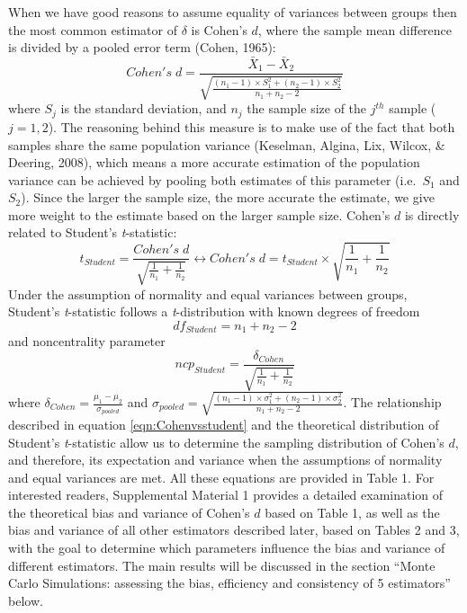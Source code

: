 \documentclass[
  12pt,
  french,
]{article}
\begin{document}
When we have good reasons to assume equality of variances between groups
then the most common estimator of \(\delta\) is Cohen's \(d\), where the
sample mean difference is divided by a pooled error term (Cohen, 1965):
\begin{equation*} 
Cohen's \; d = \frac{\bar{X}_1-\bar{X}_2}{\sqrt{\frac{(n_1-1) \times S_1^2+(n_2-1) \times S_2^2}{n_1+n_2-2}}}
\label{eqn:Cohends}
\end{equation*} where \(S_j\) is the standard deviation, and \(n_j\) the
sample size of the \(j^{th}\) sample (\(j=1,2\)). The reasoning behind
this measure is to make use of the fact that both samples share the same
population variance (Keselman, Algina, Lix, Wilcox, \& Deering, 2008),
which means a more accurate estimation of the population variance can be
achieved by pooling both estimates of this parameter (i.e.~\(S_1\) and
\(S_2\)). Since the larger the sample size, the more accurate the
estimate, we give more weight to the estimate based on the larger sample
size. Cohen's \(d\) is directly related to Student's \emph{t}-statistic:
\begin{equation} 
t_{Student}=\frac{Cohen's \; d}{\sqrt{\frac{1}{n_1}+\frac{1}{n_2}}}\leftrightarrow Cohen's \; d =  t_{Student} \times \sqrt{\frac{1}{n_1}+\frac{1}{n_2}}
\label{eqn:Cohenvsstudent}
\end{equation} Under the assumption of normality and equal variances
between groups, Student's \emph{t}-statistic follows a
\emph{t}-distribution with known degrees of freedom \begin{equation} 
df_{Student} = n_1+n_2-2
\label{eqn:studentdf}
\end{equation} and noncentrality parameter
\[ncp_{Student} = \frac{\delta_{Cohen}}{\sqrt{\frac{1}{n_1}+\frac{1}{n_2}}}\]
where \(\delta_{Cohen}= \frac{\mu_1-\mu_2}{\sigma_{pooled}}\) and
\(\sigma_{pooled}= \sqrt{\frac{(n_1-1) \times \sigma^2_1+(n_2-1) \times \sigma^2_2}{n_1+n_2-2}}\).
The relationship described in equation \ref{eqn:Cohenvsstudent} and the
theoretical distribution of Student's \emph{t}-statistic allow us to
determine the sampling distribution of Cohen's \(d\), and therefore, its
expectation and variance when the assumptions of normality and equal
variances are met. All these equations are provided in Table 1. For
interested readers, Supplemental Material 1 provides a detailed
examination of the theoretical bias and variance of Cohen's \(d\) based
on Table 1, as well as the bias and variance of all other estimators
described later, based on Tables 2 and 3, with the goal to determine
which parameters influence the bias and variance of different
estimators. The main results will be discussed in the section ``Monte
Carlo Simulations: assessing the bias, efficiency and consistency of 5
estimators'' below.
\end{document}
